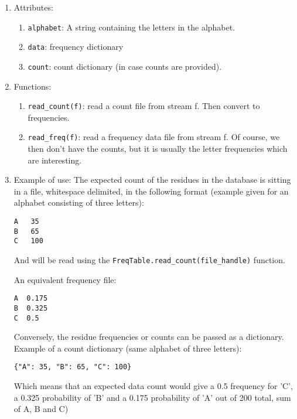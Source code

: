 \begin{enumerate}

  \item Attributes:


  \begin{enumerate}
    \item \verb|alphabet|: A string containing the letters in the alphabet.
    \item \verb|data|: frequency dictionary
    \item \verb|count|: count dictionary (in case counts are provided).
  \end{enumerate}

  \item Functions:
  \begin{enumerate}
    \item \verb|read_count(f)|: read a count file from stream f. Then convert to frequencies.
    \item \verb|read_freq(f)|: read a frequency data file from stream f. Of course, we then don't have the counts, but it is usually the letter frequencies which are interesting.
  \end{enumerate}

  \item Example of use:
  The expected count of the residues in the database is sitting in a file, whitespace delimited, in the following format (example given for an alphabet consisting of three letters):

\begin{verbatim}
A   35
B   65
C   100
\end{verbatim}

And will be read using the \verb|FreqTable.read_count(file_handle)| function.

An equivalent frequency file:

\begin{verbatim}
A  0.175
B  0.325
C  0.5
\end{verbatim}

Conversely, the residue frequencies or counts can be passed as a dictionary.
Example of a count dictionary (same alphabet of three letters):

\begin{verbatim}
{"A": 35, "B": 65, "C": 100}
\end{verbatim}

Which means that an expected data count would give a 0.5 frequency
for 'C', a 0.325 probability of 'B' and a 0.175 probability of 'A'
out of 200 total, sum of A, B and C)


\end{enumerate}
